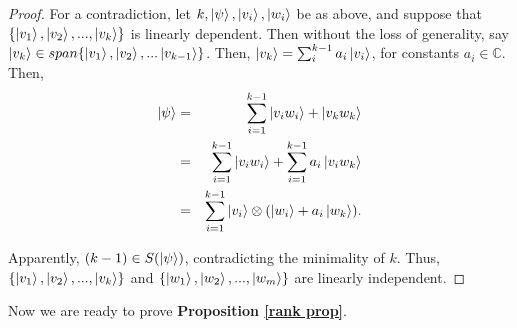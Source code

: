 \begin{proof}
For a contradiction, let $k, \ket{\psi}, \ket{v_i}, \ket{w_i}$ be as above, and suppose that $\{\ket{v_1}, \ket{v_2},...,\ket{v_k}\}$ is linearly dependent. Then without the loss of generality, say $\ket{v_k} \in span\{\ket{v_1}, \ket{v_2},...\ket{v_{k-1}}\}$. Then, $\ket{v_k}=\sum_i^{k-1} a_i \ket{v_i}$, for constants $a_i \in \mathbb{C}$.  Then, 
\begin{eqnarray*}
\ket{\psi}&=&\sum_{i=1}^{k-1} \ket{v_i w_i} + \ket{v_k w_k}\\
&=&\sum_{i=1}^{k-1} \ket{v_i w_i} + \sum_{i=1}^{k-1} a_i\ket{v_iw_k}\\
&=&\sum_{i=1}^{k-1} \ket{v_i} \otimes (\ket{w_i}+a_i\ket{w_k}).\\
\end{eqnarray*}

Apparently, $(k-1) \in S(\ket{\psi})$, contradicting the minimality of $k$.  Thus, $\{\ket{v_1}, \ket{v_2},...,\ket{v_k}\}$ and $\{\ket{w_1}, \ket{w_2},...,\ket{w_m}\}$ are linearly independent.
\end{proof}

\bigskip
Now we are ready to prove \textbf{Proposition \ref{rank prop}}.

